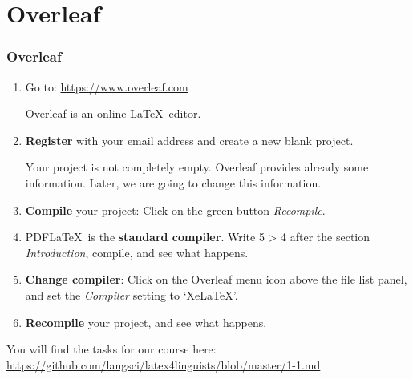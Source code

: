 \section{Overleaf}

\begin{frame}
\frametitle{Overleaf}

\begin{enumerate}
	\item Go to: \url{https://www.overleaf.com}
	
	Overleaf is an online \LaTeX\ editor. 
	
	\item \textbf{Register} with your email address and create a new blank project.
	
	Your project is not completely empty. Overleaf provides already some information. Later, we are going to change this information.
	
	\item \textbf{Compile} your project: Click on the green button \emph{Recompile}.
	
	\item PDF\LaTeX\ is the \textbf{standard compiler}. 
	Write 5 > 4 after the section \emph{Introduction}, compile, and see what happens.
	
	\item \textbf{Change compiler}: Click on the Overleaf menu icon above the file list panel, and set the \emph{Compiler} setting to `Xe\LaTeX '.
	
	\item \textbf{Recompile} your project, and see what happens.
	
\end{enumerate}

\bigskip 

You will find the tasks for our course here: \url{https://github.com/langsci/latex4linguists/blob/master/1-1.md}

%
%	
%


\end{frame}
